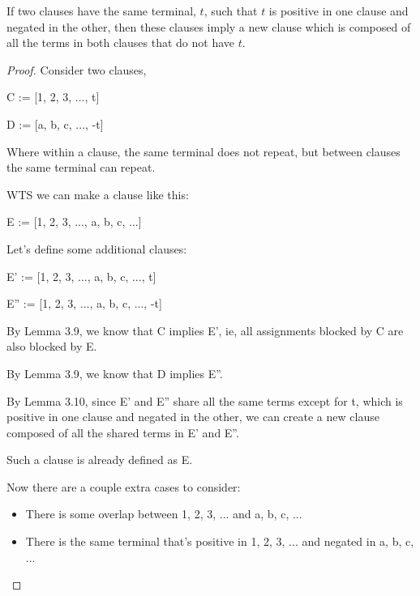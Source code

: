 \documentclass[manuscript]{acmart}
\begin{document}
    \begin{lemma}
        If two clauses have the same terminal, $t$, such that $t$ is positive
        in one clause and negated in the other, then these clauses imply a new
        clause which is composed of all the terms in both clauses that do not 
        have $t$.
    \end{lemma}
    \begin{proof}
        Consider two clauses, 

        C := [1, 2, 3, ..., t]

        D := [a, b, c, ..., -t]

        Where within a clause, the same terminal does not repeat, but between
        clauses the same terminal can repeat.

        WTS we can make a clause like this:

        E := [1, 2, 3, ..., a, b, c, ...]

        Let's define some additional clauses:

        E' := [1, 2, 3, ..., a, b, c, ..., t]

        E'' := [1, 2, 3, ..., a, b, c, ..., -t]



        By Lemma 3.9, we know that C implies E', ie, all assignments blocked by
        C are also blocked by E.

        By Lemma 3.9, we know that D implies E''.

        By Lemma 3.10, since E' and E'' share all the same terms except for t, which
        is positive in one clause and negated in the other, we can create a new
        clause composed of all the shared terms in E' and E''.

        Such a clause is already defined as E.

        Now there are a couple extra cases to consider:
        
        \begin{itemize}
            \item There is some overlap between 1, 2, 3, ... and a, b, c, ...
            \item There is the same terminal that's positive in 1, 2, 3, ... and negated in a, b, c, ...
        \end{itemize}


\end{proof}
\end{document}
